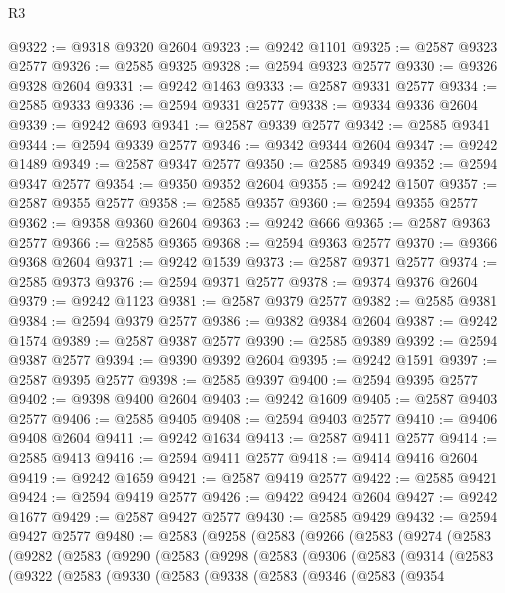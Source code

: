 \begin{lexlean}{R3}
\begin{coremodule}
@9322 := @9318 @9320 @2604
@9323 := @9242 @1101
@9325 := @2587 @9323 @2577
@9326 := @2585 @9325
@9328 := @2594 @9323 @2577
@9330 := @9326 @9328 @2604
@9331 := @9242 @1463
@9333 := @2587 @9331 @2577
@9334 := @2585 @9333
@9336 := @2594 @9331 @2577
@9338 := @9334 @9336 @2604
@9339 := @9242 @693
@9341 := @2587 @9339 @2577
@9342 := @2585 @9341
@9344 := @2594 @9339 @2577
@9346 := @9342 @9344 @2604
@9347 := @9242 @1489
@9349 := @2587 @9347 @2577
@9350 := @2585 @9349
@9352 := @2594 @9347 @2577
@9354 := @9350 @9352 @2604
@9355 := @9242 @1507
@9357 := @2587 @9355 @2577
@9358 := @2585 @9357
@9360 := @2594 @9355 @2577
@9362 := @9358 @9360 @2604
@9363 := @9242 @666
@9365 := @2587 @9363 @2577
@9366 := @2585 @9365
@9368 := @2594 @9363 @2577
@9370 := @9366 @9368 @2604
@9371 := @9242 @1539
@9373 := @2587 @9371 @2577
@9374 := @2585 @9373
@9376 := @2594 @9371 @2577
@9378 := @9374 @9376 @2604
@9379 := @9242 @1123
@9381 := @2587 @9379 @2577
@9382 := @2585 @9381
@9384 := @2594 @9379 @2577
@9386 := @9382 @9384 @2604
@9387 := @9242 @1574
@9389 := @2587 @9387 @2577
@9390 := @2585 @9389
@9392 := @2594 @9387 @2577
@9394 := @9390 @9392 @2604
@9395 := @9242 @1591
@9397 := @2587 @9395 @2577
@9398 := @2585 @9397
@9400 := @2594 @9395 @2577
@9402 := @9398 @9400 @2604
@9403 := @9242 @1609
@9405 := @2587 @9403 @2577
@9406 := @2585 @9405
@9408 := @2594 @9403 @2577
@9410 := @9406 @9408 @2604
@9411 := @9242 @1634
@9413 := @2587 @9411 @2577
@9414 := @2585 @9413
@9416 := @2594 @9411 @2577
@9418 := @9414 @9416 @2604
@9419 := @9242 @1659
@9421 := @2587 @9419 @2577
@9422 := @2585 @9421
@9424 := @2594 @9419 @2577
@9426 := @9422 @9424 @2604
@9427 := @9242 @1677
@9429 := @2587 @9427 @2577
@9430 := @2585 @9429
@9432 := @2594 @9427 @2577
@9480 := @2583
    (@9258
      (@2583
        (@9266
          (@2583
            (@9274
              (@2583
                (@9282
                  (@2583
                    (@9290
                      (@2583
                        (@9298
                          (@2583
                            (@9306
                              (@2583
                                (@9314
                                  (@2583
                                    (@9322
                                      (@2583
                                        (@9330
                                          (@2583
                                            (@9338
                                              (@2583
                                                (@9346
                                                  (@2583
                                                    (@9354

\end{coremodule}
\end{lexlean}
